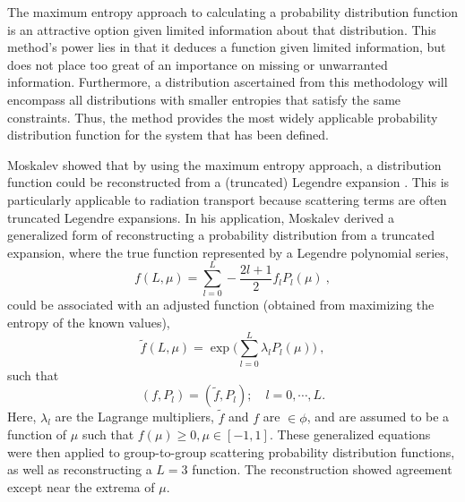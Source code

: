 The maximum entropy approach to calculating a probability distribution function
is an attractive option given limited information about that
distribution. This method's power lies in that it
deduces a function given limited information, but does not place too great of an
importance on missing or unwarranted information. Furthermore, a distribution
ascertained from this methodology will encompass all distributions with smaller
entropies that satisfy the same constraints. Thus, the method provides the most widely
applicable probability distribution function for the system that has been
defined.

Moskalev showed that by using the maximum entropy approach, a distribution function
could be reconstructed from a (truncated) Legendre expansion
\cite{moskalev_reconstruction_1993}. This is particularly
applicable to radiation transport because scattering terms are often truncated
Legendre expansions. In his application, Moskalev derived a generalized form of
reconstructing a probability distribution from a truncated expansion, where the
true function represented by a Legendre polynomial series,
\begin{equation}
  f(L,\mu) = \sum_{l=0}^L -\frac{2l+1}{2} f_l P_l(\mu)\:,
\end{equation}
could be associated with an adjusted function (obtained from maximizing the
entropy of the known values),
\begin{equation}
  \tilde{f}(L,\mu) = \exp \big( \sum_{l=0}^{L} \lambda_l P_l(\mu) \big)\:,
\end{equation}
such that
\begin{equation}
  (f,P_l) = (\tilde{f}, P_l); \quad l = 0, \cdots, L .
\end{equation}
Here, $\lambda_l$ are the Lagrange multipliers, $\tilde{f}$ and $f$ are
$\in \phi$, and are assumed to be a function of $\mu$ such that $f(\mu)
\geq 0, \mu \in [-1, 1]$.
These generalized equations were then applied to
group-to-group scattering probability distribution functions, as well as
reconstructing a $L=3$ function. The reconstruction showed agreement except near
the extrema of $\mu$.

